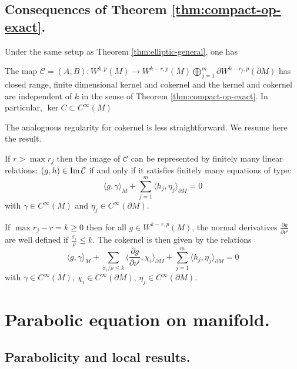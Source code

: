 \subsection{Consequences of Theorem \ref{thm:compact-op-exact}.}
\label{sec:orge2f277f}
Under the same setup as Theorem \ref{thm:elliptic-general}, one has

\begin{theorem}
\label{thm:ref-kernel}
The map \(\mathcal{C} = (A,B): W^{k,p}(M) \longrightarrow W^{k-r,p}(M) \bigoplus_{j=1}^m
\partial W^{k-r_j,p}( \partial M)\) has closed range, finite dimensional kernel and
cokernel and the kernel and cokernel are independent of \(k\) in the sense of Theorem
\ref{thm:compact-op-exact}. In particular, \(\ker C \subset C^\infty(M)\)
\end{theorem}

The analoguous regularity for cokernel is less straightforward. We resume here the result.

\begin{theorem}
\label{thm:reg-coker}
If \(r>\max r_j\) then the image of \(\mathcal{C}\) can be represented by finitely
many linear relations: \((g,h)\in \mathop{\rm Im}\nolimits \mathcal{C}\) if and only if it satisfies finitely
many equations of type:
\[
 \langle g,\gamma \rangle_M + \sum_{j=1}^m \langle h_j, \eta_j \rangle_{\partial M} = 0
\]
with \(\gamma\in C^\infty(M)\) and \(\eta_j\in C^\infty (\partial M)\).

If \(\max r_j -r = k \geq 0\) then for all \(g\in W^{k-r,p}(M)\), the normal
derivatives \(\frac{\partial g}{\partial \nu^i}\) are well defined if \(\frac{\sigma_i}{\rho}\leq k\). The cokernel is then given by the relations
\[
 \langle g, \gamma \rangle_M + \sum_{\sigma_i/\rho \leq k} \langle \frac{\partial
g}{\partial \nu^i},\chi_i \rangle_{\partial M} + \sum_{j=1}^m \langle h_j, \eta_j
\rangle_{\partial M}=0
\]
with \(\gamma\in C^\infty(M)\), \(\chi_i\in C^\infty (\partial M)\), \(\eta_j\in
C^\infty (\partial M)\). 
\end{theorem}


\section{Parabolic equation on manifold.}
\label{sec:org414d75c}

\subsection{Parabolicity and local results.}
\label{sec:org4c87ce2}

